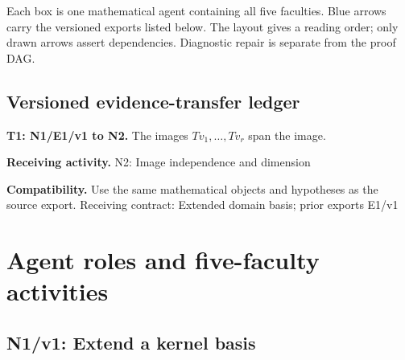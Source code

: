 \documentclass[preprint,12pt,aps,pra,showkeys,amsmath,amssymb,superscriptaddress,floatfix]{revtex4-2}
\theoremstyle{definition}
\theoremstyle{remark}
\newcommand{\field}[2]{\par\smallskip\noindent\textbf{#1.} #2\par}
\begin{document}
\begin{center}\end{center}

Each box is one mathematical agent containing all five faculties. Blue
arrows carry the versioned exports listed below. The layout gives a
reading order; only drawn arrows assert dependencies. Diagnostic repair
is separate from the proof DAG.

\subsection{Versioned evidence-transfer ledger}

\begingroup\small\linespread{1.05}\selectfont

\field{T1: N1/E1/v1 to N2}{The images \(Tv_{1},\ldots ,Tv_r\) span the image.}

\field{Receiving activity}{N2: Image independence and dimension}

\field{Compatibility}{Use the same mathematical objects and hypotheses as the source export.
Receiving contract: Extended domain basis; prior exports E1/v1}

\endgroup

\clearpage\section{Agent roles and five-faculty activities}\begingroup\small\linespread{1.05}\selectfont{}

\subsection{N1/v1: Extend a kernel basis}
\end{document}
